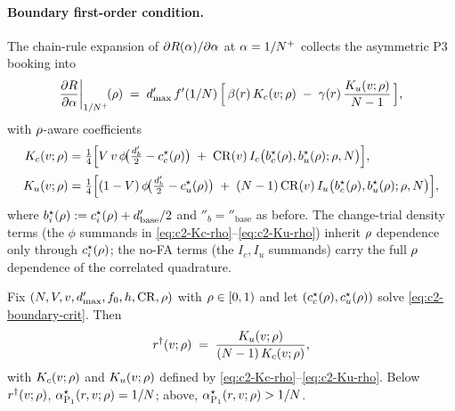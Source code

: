 \paragraph{Boundary first-order condition.}
The chain-rule expansion of $\partial R(\alpha)/\partial\alpha$
at $\alpha = 1/N^{+}$ collects the asymmetric P3 booking into
\begin{equation}
  \frac{\partial R}{\partial\alpha}\bigg|_{1/N^{+}}\!(\rho)
  \;=\;
  d'_{\max}\,f'(1/N)\,
  \Bigl[\,\beta(r)\,K_c(v; \rho)
        \;-\; \gamma(r)\,\frac{K_u(v; \rho)}{N - 1}\,\Bigr],
  \label{eq:c2-rho-foc}
\end{equation}
with $\rho$-aware coefficients
\begin{align}
  K_c(v; \rho)
  &= \tfrac{1}{4}\Big[V\,v\,
                      \phi\!\big(\tfrac{d'_b}{2} - c_c^\star(\rho)\big)
                      \;+\; \mathrm{CR}(v)\,
                      I_c\bigl(b_c^\star(\rho), b_u^\star(\rho); \rho, N\bigr)\Big],
  \label{eq:c2-Kc-rho}
  \\[2pt]
  K_u(v; \rho)
  &= \tfrac{1}{4}\Big[(1 - V)\,
                      \phi\!\big(\tfrac{d'_b}{2} - c_u^\star(\rho)\big)
                      \;+\; (N - 1)\,\mathrm{CR}(v)\,
                      I_u\bigl(b_c^\star(\rho), b_u^\star(\rho); \rho, N\bigr)\Big],
  \label{eq:c2-Ku-rho}
\end{align}
where $b_i^\star(\rho) := c_i^\star(\rho) + d'_{\mathrm{base}}/2$
and $\dprime_b = \dprime_{\mathrm{base}}$ as before. The
change-trial density terms (the $\phi$ summands in
\eqref{eq:c2-Kc-rho}--\eqref{eq:c2-Ku-rho}) inherit $\rho$
dependence only through $c_i^\star(\rho)$; the no-FA terms (the
$I_c, I_u$ summands) carry the full $\rho$ dependence of the
correlated quadrature.

\begin{proposition}
\label{prop:r-dagger-rho}
Fix $(N, V, v, d'_{\max}, f_0, h, \mathrm{CR}, \rho)$ with
$\rho \in [0, 1)$ and let $(c_c^\star(\rho), c_u^\star(\rho))$
solve \eqref{eq:c2-boundary-crit}. Then
\begin{equation}
  r^{\dagger}(v; \rho)
  \;=\;
  \frac{K_u(v; \rho)}{(N - 1)\,K_c(v; \rho)},
  \label{eq:r-dagger-rho}
\end{equation}
with $K_c(v; \rho)$ and $K_u(v; \rho)$ defined by
\eqref{eq:c2-Kc-rho}--\eqref{eq:c2-Ku-rho}. Below $r^{\dagger}(v;\rho)$,
$\alpha^\star_{\mathrm{P_1}}(r, v; \rho) = 1/N$; above,
$\alpha^\star_{\mathrm{P_1}}(r, v; \rho) > 1/N$.
\end{proposition}

